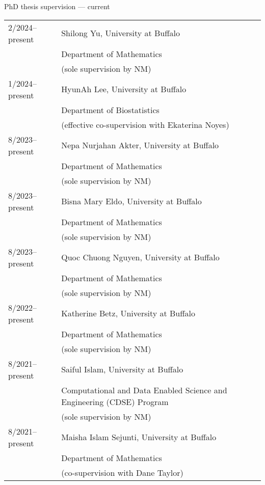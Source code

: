 \documentclass[11pt,letter]{article}
\renewenvironment{itemize}{
  \begin{list}{}{
    \setlength{\leftmargin}{1.5em}
    \setlength{\itemsep}{0.25em}
    \setlength{\parskip}{0pt}
    \setlength{\parsep}{0.25em}
  }
}{
  \end{list}
}
\begin{document}
\begin{itemize}
\item PhD thesis supervision --- current

\smallskip

\begin{tabular}{ll}
2/2024--present & Shilong Yu, University at Buffalo\\
& Department of Mathematics\\
& (sole supervision by NM)\\[1.5mm]
%
1/2024--present & HyunAh Lee, University at Buffalo\\
& Department of Biostatistics\\
& (effective co-supervision with Ekaterina Noyes)\\[1.5mm]
%
8/2023--present & Nepa Nurjahan Akter, University at Buffalo\\
& Department of Mathematics\\
& (sole supervision by NM)\\[1.5mm]
%
8/2023--present & Bisna Mary Eldo, University at Buffalo\\
& Department of Mathematics\\
& (sole supervision by NM)\\[1.5mm]
%
8/2023--present & Quoc Chuong Nguyen, University at Buffalo\\
& Department of Mathematics\\
& (sole supervision by NM)\\[1.5mm]
%
8/2022--present & Katherine Betz, University at Buffalo\\
& Department of Mathematics\\
& (sole supervision by NM)\\[1.5mm]
%
8/2021--present & Saiful Islam, University at Buffalo\\
& Computational and Data Enabled Science and Engineering (CDSE) Program\\
& (sole supervision by NM)\\[1.5mm]
%
8/2021--present & Maisha Islam Sejunti, University at Buffalo\\
& Department of Mathematics\\
& (co-supervision with Dane Taylor)\\[1.5mm]
%

\end{tabular}
\end{itemize}
\end{document}
